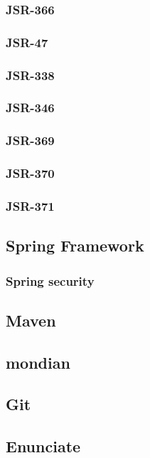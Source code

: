 		\subsubsection{JSR-366}
				\lipsum[1-2]
		\subsubsection{JSR-47}
				\lipsum[1-2]
		\subsubsection{JSR-338}
				\lipsum[1-2]
		\subsubsection{JSR-346}
				\lipsum[1-2]
		\subsubsection{JSR-369}
				\lipsum[1-2]
		\subsubsection{JSR-370}
		\lipsum[1-2]
		\subsubsection{JSR-371}
		\lipsum[1-2]
	\subsection{Spring Framework}
			\lipsum[1-2]
		\subsubsection{Spring security}
				\lipsum[1-2]
	\subsection{Maven}
			\lipsum[1-2]
	\subsection{mondian}
			\lipsum[1-2]
	\subsection{Git}
			\lipsum[1-2]
	\subsection{Enunciate}
			\lipsum[1-2]
